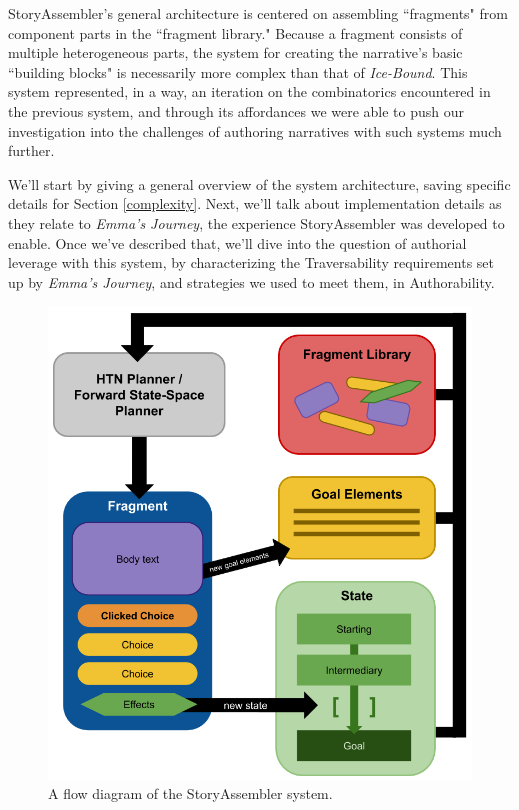 StoryAssembler's general architecture is centered on assembling ``fragments" from component parts in the ``fragment library." Because a fragment consists of multiple heterogeneous parts, the system for creating the narrative's basic ``building blocks" is necessarily more complex than that of \textit{Ice-Bound}. This system represented, in a way, an iteration on the combinatorics encountered in the previous system, and through its affordances we were able to push our investigation into the challenges of authoring narratives with such systems much further. 

We'll start by giving a general overview of the system architecture, saving specific details for Section \ref{complexity}. Next, we'll talk about implementation details as they relate to \textit{Emma's Journey}, the experience StoryAssembler was developed to enable. Once we've described that, we'll dive into the question of authorial leverage with this system, by characterizing the Traversability requirements set up by \textit{Emma's Journey}, and strategies we used to meet them, in Authorability.

\begin{figure}
    \centering
    \includegraphics[width=\textwidth]{figures/3-StoryAssembler/storyassembler-system-diagram.png}
    \caption{A flow diagram of the StoryAssembler system.}
    \label{fig:system-diagram}
\end{figure}


